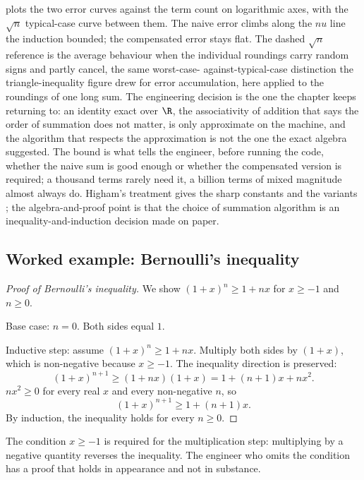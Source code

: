 

 plots the two error curves against
the term count on logarithmic axes, with the $\sqrt{n}$ typical-case
curve between them. The naive error climbs along the $n u$ line the
induction bounded; the compensated error stays flat. The dashed
$\sqrt{n}$ reference is the average behaviour when the individual
roundings carry random signs and partly cancel, the same worst-case-
against-typical-case distinction the triangle-inequality figure drew for
error accumulation, here applied to the roundings of one long sum. The
engineering decision is the one the chapter keeps returning to: an
identity exact over $\R$, the associativity of addition that says the
order of summation does not matter, is only approximate on the machine,
and the algorithm that respects the approximation is not the one the
exact algebra suggested. The bound is what tells the engineer, before
running the code, whether the naive sum is good enough or whether the
compensated version is required; a thousand terms rarely need it, a
billion terms of mixed magnitude almost always do. Higham's treatment
gives the sharp constants and the variants \cite{text:higham-numerical};
the algebra-and-proof point is that the choice of summation algorithm is
an inequality-and-induction decision made on paper.

\subsection{Worked example: Bernoulli's inequality}

\begin{proof}[Proof of Bernoulli's inequality]
We show $(1 + x)^{n} \geq 1 + nx$ for $x \geq -1$ and $n \geq 0$.

Base case: $n = 0$. Both sides equal $1$.

Inductive step: assume $(1 + x)^{n} \geq 1 + nx$. Multiply both sides
by $(1+x)$, which is non-negative because $x \geq -1$. The
inequality direction is preserved:
\[
(1 + x)^{n+1} \geq (1 + nx)(1 + x) = 1 + (n+1) x + n x^{2}.
\]
$n x^{2} \geq 0$ for every real $x$ and every non-negative $n$, so
\[
(1 + x)^{n+1} \geq 1 + (n+1) x.
\]
By induction, the inequality holds for every $n \geq 0$.
\end{proof}

The condition $x \geq -1$ is required for the multiplication step:
multiplying by a negative quantity reverses the inequality. The
engineer who omits the condition has a proof that holds in
appearance and not in substance.

